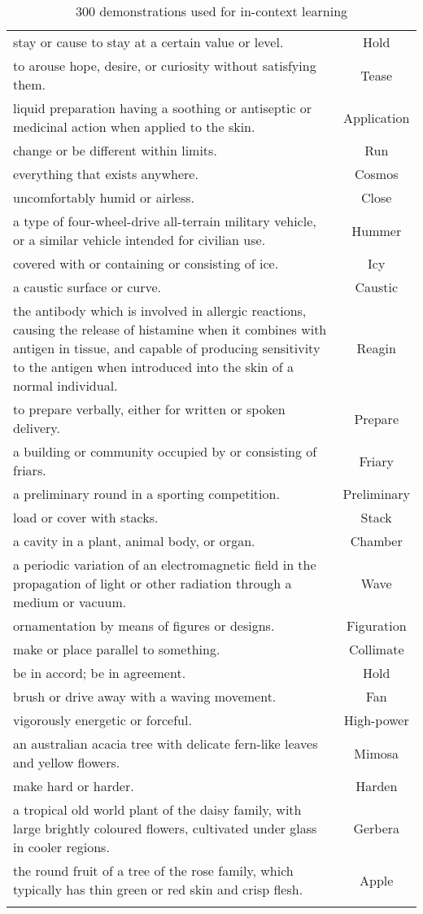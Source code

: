 \documentclass{article}
\begin{document}
\begin{longtable}{p{12cm}c}
stay or cause to stay at a certain value or level. & Hold\\
to arouse hope, desire, or curiosity without satisfying them. & Tease\\
liquid preparation having a soothing or antiseptic or medicinal action when applied to the skin. & Application\\
change or be different within limits. & Run\\
everything that exists anywhere. & Cosmos\\
uncomfortably humid or airless. & Close\\
a type of four-wheel-drive all-terrain military vehicle, or a similar vehicle intended for civilian use. & Hummer\\
covered with or containing or consisting of ice. & Icy\\
a caustic surface or curve. & Caustic\\
the antibody which is involved in allergic reactions, causing the release of histamine when it combines with antigen in tissue, and capable of producing sensitivity to the antigen when introduced into the skin of a normal individual. & Reagin\\
to prepare verbally, either for written or spoken delivery. & Prepare\\
a building or community occupied by or consisting of friars. & Friary\\
a preliminary round in a sporting competition. & Preliminary\\
load or cover with stacks. & Stack\\
a cavity in a plant, animal body, or organ. & Chamber\\
a periodic variation of an electromagnetic field in the propagation of light or other radiation through a medium or vacuum. & Wave\\
ornamentation by means of figures or designs. & Figuration\\
make or place parallel to something. & Collimate\\
be in accord; be in agreement. & Hold\\
brush or drive away with a waving movement. & Fan\\
vigorously energetic or forceful. & High-power\\
an australian acacia tree with delicate fern-like leaves and yellow flowers. & Mimosa\\
make hard or harder. & Harden\\
a tropical old world plant of the daisy family, with large brightly coloured flowers, cultivated under glass in cooler regions. & Gerbera\\
the round fruit of a tree of the rose family, which typically has thin green or red skin and crisp flesh. & Apple\\
\caption{300 demonstrations used for in-context learning}
\end{longtable}
\end{document}
